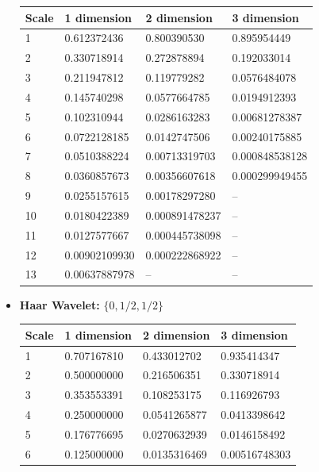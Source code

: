 \documentclass[12pt,a4paper]{article}
\begin{document}
\begin{itemize}
\begin{tabular}{llll}
Scale & 1 dimension      & 2 dimension     & 3 dimension\\ \hline
1     & 0.612372436      & 0.800390530     & 0.895954449  \\
2     & 0.330718914	 & 0.272878894     & 0.192033014\\
3     & 0.211947812	 & 0.119779282     & 0.0576484078\\
4     & 0.145740298	 & 0.0577664785    & 0.0194912393\\
5     & 0.102310944	 & 0.0286163283    & 0.00681278387\\
6     & 0.0722128185	 & 0.0142747506    & 0.00240175885\\
7     & 0.0510388224	 & 0.00713319703   & 0.000848538128 \\
8     & 0.0360857673	 & 0.00356607618   & 0.000299949455 \\
9     & 0.0255157615	 & 0.00178297280   & -- \\
10    & 0.0180422389	 & 0.000891478237  & --  \\
11    & 0.0127577667	 & 0.000445738098  & --  \\
12    & 0.00902109930	 & 0.000222868922  & --  \\
13    & 0.00637887978	 & --		   & -- \\

\end{tabular}

\item \textbf{Haar Wavelet:} $\{0,1/2,1/2\}$

\begin{tabular}{llll}
Scale & 1 dimension      & 2 dimension     & 3 dimension\\ \hline
1     & 0.707167810      & 0.433012702     & 0.935414347 \\
2     & 0.500000000	 & 0.216506351     & 0.330718914\\
3     & 0.353553391	 & 0.108253175     & 0.116926793\\
4     & 0.250000000	 & 0.0541265877    & 0.0413398642\\
5     & 0.176776695	 & 0.0270632939    & 0.0146158492\\
6     & 0.125000000	 & 0.0135316469    & 0.00516748303

\end{tabular}


\end{itemize}
\end{document}

